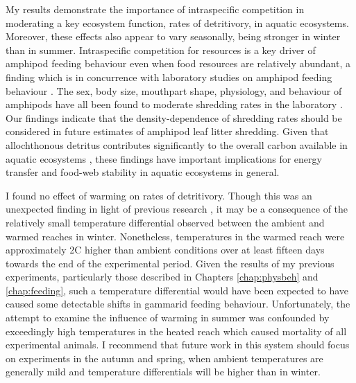 My results demonstrate the importance of intraspecific competition in moderating a key ecosystem function, rates of detritivory, in aquatic ecosystems. Moreover, these effects also appear to vary seasonally, being stronger in winter than in summer. Intraspecific competition for resources is a key driver of amphipod feeding behaviour even when food resources are relatively abundant, a finding which is in concurrence with laboratory studies on amphipod feeding behaviour \citep{mancinelli2012, labaude2016, vandervorste2017}. The sex, body size, mouthpart shape, physiology, and behaviour of amphipods have all been found to moderate shredding rates in the laboratory \citep{rota2018}. Our findings indicate that the density-dependence of shredding rates should be considered in future estimates of amphipod leaf litter shredding. Given that allochthonous detritus contributes significantly to the overall carbon available in aquatic ecosystems \citep{wallace1997}, these findings have important implications for energy transfer and food-web stability in aquatic ecosystems in general.

I found no effect of warming on rates of detritivory. Though this was an unexpected finding in light of previous research \citep[Chapter \ref{chap:feeding}]{labaude2016, pellan2016, kenna2017, laverty2017}, it may be a consequence of the relatively small temperature differential observed between the ambient and warmed reaches in winter. Nonetheless, temperatures in the warmed reach were approximately 2\degree C higher than ambient conditions over at least fifteen days towards the end of the experimental period. Given the results of my previous experiments, particularly those described in Chapters \ref{chap:physbeh} and \ref{chap:feeding}, such a temperature differential would have been expected to have caused some detectable shifts in gammarid feeding behaviour. Unfortunately, the attempt to examine the influence of warming in summer was confounded by exceedingly high temperatures in the heated reach which caused mortality of all experimental animals. I recommend that future work in this system should focus on experiments in the autumn and spring, when ambient temperatures are generally mild and temperature differentials will be higher than in winter. 

